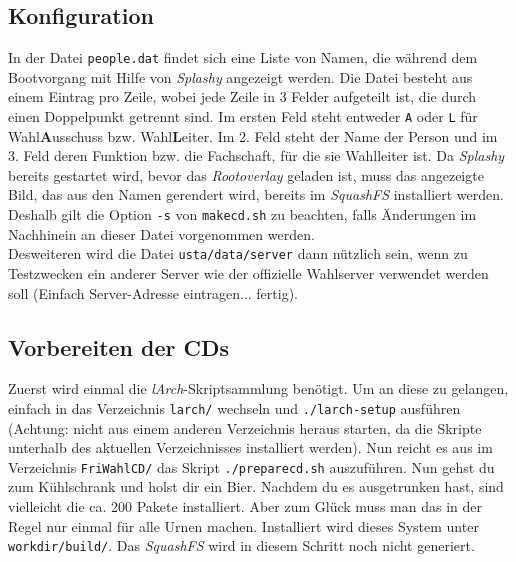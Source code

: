 \documentclass[a4paper,10pt]{article}
\begin{document}
\subsection{Konfiguration}
In der Datei \texttt{people.dat} findet sich eine Liste von Namen, die während dem Bootvorgang mit Hilfe von \textit{Splashy} angezeigt werden. Die Datei besteht aus einem Eintrag pro Zeile, wobei jede Zeile in 3 Felder aufgeteilt ist, die durch einen Doppelpunkt getrennt sind. Im ersten Feld steht entweder \texttt{A} oder \texttt{L} für Wahl\textbf{A}usschuss bzw. Wahl\textbf{L}eiter. Im 2. Feld steht der Name der Person und im 3. Feld deren Funktion bzw. die Fachschaft, für die sie Wahlleiter ist. Da \textit{Splashy} bereits gestartet wird, bevor das \textit{Rootoverlay} geladen ist, muss das angezeigte Bild, das aus den Namen gerendert wird, bereits im \textit{SquashFS} installiert werden. Deshalb gilt die Option \texttt{-s} von \texttt{makecd.sh} zu beachten, falls Änderungen im Nachhinein an dieser Datei vorgenommen werden. \\
Desweiteren wird die Datei \texttt{usta/data/server} dann nützlich sein, wenn zu Testzwecken ein anderer Server wie der offizielle Wahlserver verwendet werden soll (Einfach Server-Adresse eintragen... fertig).

\subsection{Vorbereiten der CDs}
Zuerst wird einmal die \textit{lArch}-Skriptsammlung benötigt. Um an diese zu gelangen, einfach in das Verzeichnis \texttt{larch/} wechseln und \texttt{./larch-setup} ausführen (Achtung: nicht aus einem anderen Verzeichnis heraus starten, da die Skripte unterhalb des aktuellen Verzeichnisses installiert werden). Nun reicht es aus im Verzeichnis \texttt{FriWahlCD/} das Skript \texttt{./preparecd.sh} auszuführen. Nun gehst du zum Kühlschrank und holst dir ein Bier. Nachdem du es ausgetrunken hast, sind vielleicht die ca. 200 Pakete installiert. Aber zum Glück muss man das in der Regel nur einmal für alle Urnen machen. Installiert wird dieses System unter \texttt{workdir/build/}. Das \textit{SquashFS} wird in diesem Schritt noch nicht generiert.
\end{document}
